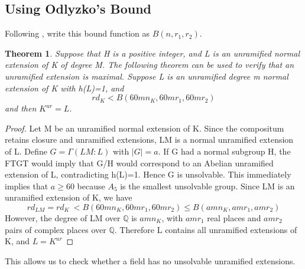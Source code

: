 \documentclass[preprint,12pt,reqno]{elsarticle}
\newtheorem{theorem}{Theorem}
\begin{document}
\subsection{Using Odlyzko's Bound}
Following \cite{YAM2}, write this bound function as $B(n,r_1,r_2)$.
\begin{theorem}
Suppose that H is a positive integer, and L is an unramified normal extension of K of degree M. The following theorem can be used to verify that an unramified extension is maximal. Suppose L is an unramified degree m  normal extension of K with h(L)=1, and 
\begin{equation}
        rd_K<B(60mn_K,60mr_1,60mr_2)
    \end{equation}
and  then $K^{ur}=L$.
\end{theorem}
\begin{proof}
Let M be an unramified normal extension of K. Since the compositum retains closure and unramified extensions, LM is a normal unramified extension of L. Define $G=\Gamma(LM:L)$ with $|G|=a$. If G had a normal subgroup H, the FTGT would imply that G/H would correspond to an Abelian unramified extension of L, contradicting h(L)=1. Hence G is unsolvable. This immediately implies that $a\geqslant 60$ because $A_5$ is the 
smallest unsolvable group. Since LM is an unramified extension of K, we have \begin{equation}
    rd_{LM}=rd_{K}\ < B(60mn_K,60mr_1,60mr_2)\leq  B(amn_K,amr_1,amr_2)
\end{equation} 
However, the degree of LM over $\mathbb{Q}$ is $amn_K$, with $amr_1$ real places and $amr_2$ pairs of complex places over $\mathbb{Q}$. Therefore L contains all unramified extensions of K, and $L=K^{ur}$
\end{proof}
This allows us to check whether a field has no unsolvable unramified extensions. 
\end{document}
